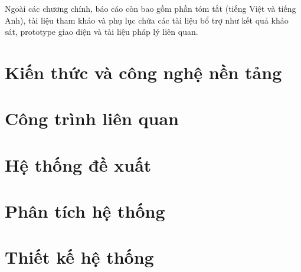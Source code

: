 \documentclass[12pt,a4paper]{article}
\theoremstyle{definition}
\begin{document}
Ngoài các chương chính, báo cáo còn bao gồm phần tóm tắt (tiếng Việt và tiếng Anh), tài liệu tham khảo và phụ lục chứa các tài liệu bổ trợ như kết quả khảo sát, prototype giao diện và tài liệu pháp lý liên quan.

\newpage
\section{Kiến thức và công nghệ nền tảng}


\newpage
\section{Công trình liên quan}


\newpage
\section{Hệ thống đề xuất}




\newpage
\section{Phân tích hệ thống}





\newpage
\section{Thiết kế hệ thống}





\newpage


\newpage



\end{document}

